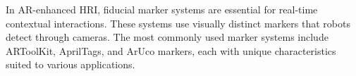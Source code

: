 In AR-enhanced HRI, fiducial marker systems are essential for real-time contextual interactions. These systems use visually distinct markers that robots detect through cameras. The most commonly used marker systems include ARToolKit, AprilTags, and ArUco markers, each with unique characteristics suited to various applications.

\begin{table}[h!]
\centering
\caption{Comparison of Fiducial Marker Systems}
\end{table}

